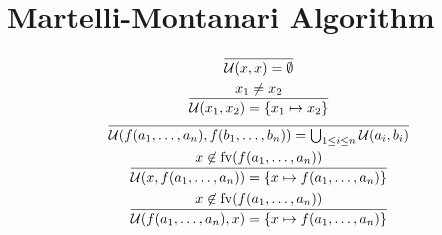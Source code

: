 \section{Martelli-Montanari Algorithm}
\label{section:martelli-montanari-fo-unification}

\cite{Martelli:1982}

\begin{gather*}
  \infer{\mathcal{U}(x, x) = \emptyset}{}
  \\
  \infer{\mathcal{U}(x_1, x_2) = \{x_1 \mapsto x_2\}}{
    x_1 \neq x_2
  }
  \\
  \infer{\mathcal{U}(f(a_1, \ldots, a_n), f(b_1, \ldots, b_n)) = \bigcup_{1 \leq i \leq n} \mathcal{U}(a_i, b_i)}{}
  \\
  \infer{\mathcal{U}(x, f(a_1, \ldots, a_n)) = \{x \mapsto f(a_1, \ldots, a_n)\}}{
    x \not\in \mathrm{fv}(f(a_1, \ldots, a_n))
  }
  \\
  \infer{\mathcal{U}(f(a_1, \ldots, a_n), x) = \{x \mapsto f(a_1, \ldots, a_n)\}}{
    x \not\in \mathrm{fv}(f(a_1, \ldots, a_n))
  }
\end{gather*}

